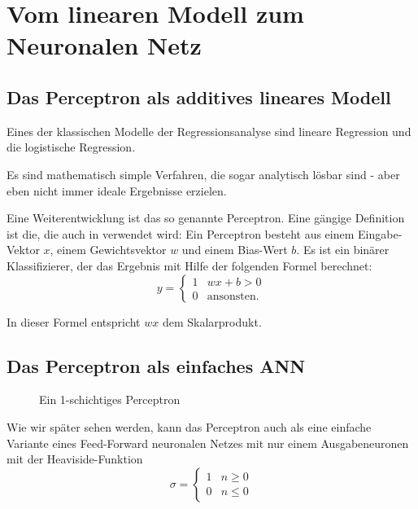 ﻿\section{Vom linearen Modell zum Neuronalen Netz}

\subsection{Das Perceptron als additives lineares Modell}
Eines der klassischen Modelle der Regressionsanalyse sind lineare Regression und die logistische Regression. 

Es sind mathematisch simple Verfahren, die sogar analytisch lösbar sind - aber eben nicht immer ideale Ergebnisse erzielen.

Eine Weiterentwicklung ist das so genannte Perceptron.
Eine gängige Definition ist die, die auch in \cite{bishop1995neural} verwendet wird: 
Ein Perceptron besteht aus einem Eingabe-Vektor $x$, einem Gewichtsvektor $w$ und einem Bias-Wert $b$. Es ist ein binärer Klassifizierer, der das Ergebnis mit Hilfe der folgenden Formel berechnet:
\begin{equation}
\label{eq:perceptron}
    y = \begin{cases}
               1               & w x + b > 0\\
               0               & \text{ansonsten}. %
           \end{cases} 
\end{equation}

In dieser Formel entspricht $wx$ dem Skalarprodukt.

\subsection{Das Perceptron als einfaches ANN}
\begin{figure}[ht!]
  \centering
    
  \caption{Ein 1-schichtiges Perceptron}
    \label{fig:SLP}
\end{figure}

Wie wir später sehen werden, kann das Perceptron auch als eine einfache Variante eines Feed-Forward neuronalen Netzes mit nur einem Ausgabeneuronen mit der Heaviside-Funktion
\begin{equation}
    \sigma = \begin{cases}
               1               & n \geq 0\\
               0               & n \leq 0
           \end{cases}
\end{equation}

